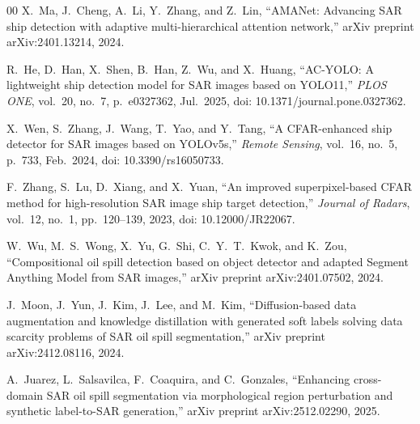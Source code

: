 \documentclass{ieeeaccess}
\begin{document}
\begin{thebibliography}{00}
X.~Ma, J.~Cheng, A.~Li, Y.~Zhang, and Z.~Lin,
``AMANet: Advancing SAR ship detection with adaptive multi-hierarchical attention network,''
arXiv preprint arXiv:2401.13214, 2024.

R.~He, D.~Han, X.~Shen, B.~Han, Z.~Wu, and X.~Huang,
``AC-YOLO: A lightweight ship detection model for SAR images based on YOLO11,''
\textit{PLOS ONE}, vol.~20, no.~7, p.~e0327362, Jul.~2025,
doi: 10.1371/journal.pone.0327362.

X.~Wen, S.~Zhang, J.~Wang, T.~Yao, and Y.~Tang,
``A CFAR-enhanced ship detector for SAR images based on YOLOv5s,''
\textit{Remote Sensing}, vol.~16, no.~5, p.~733, Feb.~2024,
doi: 10.3390/rs16050733.

F.~Zhang, S.~Lu, D.~Xiang, and X.~Yuan,
``An improved superpixel-based CFAR method for high-resolution SAR image ship target detection,''
\textit{Journal of Radars}, vol.~12, no.~1, pp.~120--139, 2023,
doi: 10.12000/JR22067.

W.~Wu, M.~S.~Wong, X.~Yu, G.~Shi, C.~Y.~T.~Kwok, and K.~Zou,
``Compositional oil spill detection based on object detector and adapted Segment Anything Model from SAR images,''
arXiv preprint arXiv:2401.07502, 2024.

J.~Moon, J.~Yun, J.~Kim, J.~Lee, and M.~Kim,
``Diffusion-based data augmentation and knowledge distillation with generated soft labels solving data scarcity problems of SAR oil spill segmentation,''
arXiv preprint arXiv:2412.08116, 2024.

A.~Juarez, L.~Salsavilca, F.~Coaquira, and C.~Gonzales,
``Enhancing cross-domain SAR oil spill segmentation via morphological region perturbation and synthetic label-to-SAR generation,''
arXiv preprint arXiv:2512.02290, 2025.

\end{thebibliography}

\renewcommand{\floatpagefraction}{.05}
\renewcommand{\dblfloatpagefraction}{.05}
\setcounter{totalnumber}{8}
\setcounter{topnumber}{8}
\setcounter{dbltopnumber}{8}
\clearpage
\end{document}
